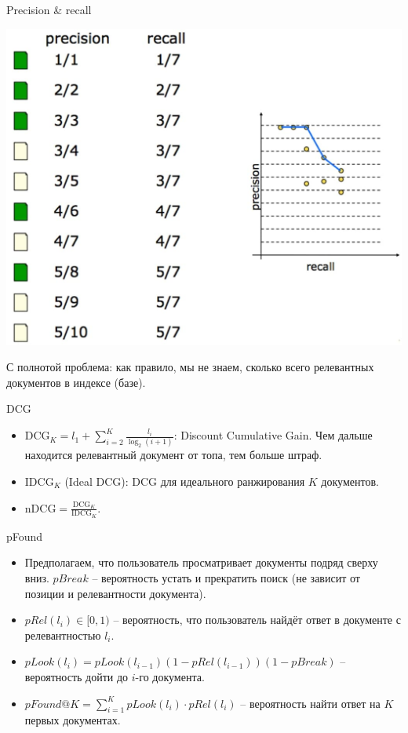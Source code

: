 \documentclass[9pt]{beamer}
\begin{document}
\begin{frame}{Precision \& recall}
\begin{center}
    \includegraphics[height=0.7\textheight]{img/ranking_precision_recall.jpg}
\end{center}
С полнотой проблема: как правило, мы не знаем, сколько всего релевантных документов в индексе (базе).
\end{frame}

\begin{frame}{DCG}
    \begin{itemize}
        \item $\text{DCG}_K = l_1 + \sum_{i=2}^K\frac{l_i}{\log_2(i+1)}$: Discount Cumulative Gain. Чем дальше находится релевантный документ от топа, тем больше штраф.
        \item $\text{IDCG}_K$ (Ideal DCG): DCG для идеального ранжирования $K$ документов.
        \item $\text{nDCG} = \frac{\text{DCG}_K}{\text{IDCG}_K}$.
    \end{itemize}
\end{frame}

\begin{frame}{pFound}
\begin{itemize}
    \item Предполагаем, что пользователь просматривает документы подряд сверху вниз. $pBreak$ -- вероятность устать и прекратить поиск (не зависит от позиции и релевантности документа).
    \item $pRel(l_i) \in [0, 1)$ -- вероятность, что пользователь найдёт ответ в документе с релевантностью $l_i$.
    \item $pLook(l_i) = pLook(l_{i-1})(1-pRel(l_{i-1}))(1-pBreak)$ – вероятность дойти до $i$-го документа.
    \item $pFound@K = \sum_{i=1}^K pLook(l_i) \cdot pRel(l_i)$ – вероятность найти ответ на $K$ первых документах.
\end{itemize}
\end{frame}
\end{document}
